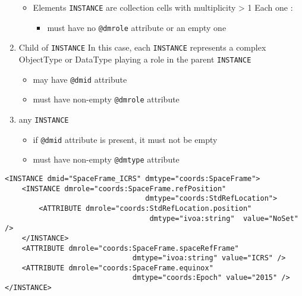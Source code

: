 \begin{enumerate}
\begin{itemize}
     \item Elements \texttt{INSTANCE} are collection cells with multiplicity > 1
          Each one :             
           \begin{itemize}
             \item must have no  \texttt{@dmrole} attribute or an empty one
           \end{itemize}
  \end{itemize}  
    
\item Child of \texttt{INSTANCE}  
     In this case, each \texttt{INSTANCE} represents 
     a complex ObjectType or DataType playing a role in the parent \texttt{INSTANCE}      
     \begin{itemize}
        \item may have  \texttt{@dmid} attribute
        \item must have non-empty  \texttt{@dmrole} attribute
     \end{itemize}
           
\item any \texttt{INSTANCE}      
   \begin{itemize}
        \item if  \texttt{@dmid} attribute is present, it must not be empty
        \item must have non-empty  \texttt{@dmtype} attribute
    \end{itemize}
\end{enumerate}  
    
   
\begin{lstlisting}[frame=single,caption={Example of \texttt{INSTANCE} child of GLOBALS},style=XML,basicstyle=\tiny]
<INSTANCE dmid="SpaceFrame_ICRS" dmtype="coords:SpaceFrame">
	<INSTANCE dmrole="coords:SpaceFrame.refPosition"
                                 dmtype="coords:StdRefLocation">
		<ATTRIBUTE dmrole="coords:StdRefLocation.position" 
		                          dmtype="ivoa:string"  value="NoSet" />
	</INSTANCE>
	<ATTRIBUTE dmrole="coords:SpaceFrame.spaceRefFrame" 
	                          dmtype="ivoa:string" value="ICRS" />
	<ATTRIBUTE dmrole="coords:SpaceFrame.equinox" 
	                          dmtype="coords:Epoch"	value="2015" />
</INSTANCE>
\end{lstlisting}   
   

